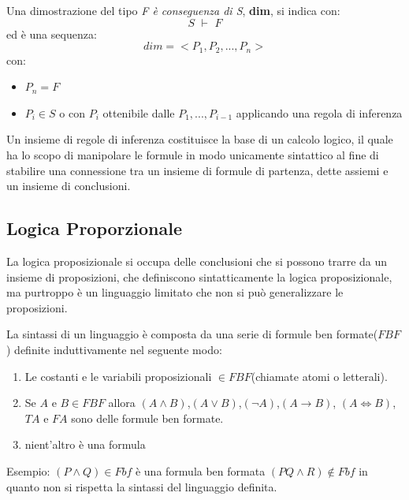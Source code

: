 \documentclass[a4paper]{report}
\begin{document}
\begin{definizione}
Una dimostrazione del tipo \textit{F è conseguenza di S}, \textbf{dim}, si indica con:
$$S\,\,\vdash\,\, F$$
ed è una sequenza:
$$dim=<P_1,P_2,...,P_n>$$
con:
\begin{itemize}
\item $P_n=F$
\item $P_i \in S$ o con $P_i$ ottenibile dalle $P_1,...,P_{i-1}$ applicando una regola di inferenza
\end{itemize}
\end{definizione}
Un insieme di regole di inferenza costituisce la base di un calcolo logico, il quale ha lo scopo di manipolare le formule in modo
unicamente sintattico al fine di stabilire una connessione tra un insieme di formule di partenza, dette assiemi e un insieme di conclusioni.

\subsection{Logica Proporzionale}
La logica proposizionale si occupa delle conclusioni che si possono trarre da un insieme di proposizioni, che definiscono sintatticamente la logica
proposizionale, ma purtroppo è un linguaggio limitato che non si può generalizzare le proposizioni.

La sintassi di un linguaggio è composta da una serie di formule ben formate($FBF$) definite induttivamente nel seguente modo:
\begin{enumerate}
  \item Le costanti e le variabili proposizionali $\in FBF$(chiamate atomi o letterali).
  \item Se $A$ e $B \in FBF$ allora $(A \land B)$,$(A \lor B)$,$(\neg A)$,$(A \rightarrow B)$,
        $(A \iff B)$,$TA$ e $FA$ sono delle formule ben formate.
  \item nient'altro è una formula
\end{enumerate}

Esempio:\newline
$(P \land Q) \in Fbf$  è una formula ben formata\newline
$(PQ \land R) \not \in Fbf$ in quanto non si rispetta la sintassi del linguaggio definita.\newline
\end{document}
